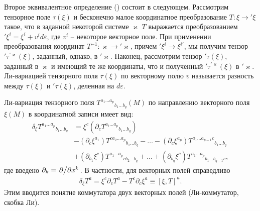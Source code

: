 \documentclass[12pt,a4paper]{article}
\begin{document}
        Второе эквивалентное определение (\cite{lie_derivative_theory}) состоит в следующем. Рассмотрим тензорное поле $\tau(\xi)$ и бесконечно малое координатное преобразование $T: \xi \rightarrow {'\xi}$ такое, что в заданной некоторой системе $\varkappa$ $T$ выражается преобразованием $'\xi^i = \xi^i + v^i d\varepsilon$, где $v^i$ -- некоторое векторное поле. При применении преобразования координат $T^{-1}: \varkappa \rightarrow {'\varkappa}$, причем $'\xi^i \rightarrow \xi^{i'}$, мы получим тензор $'\tau^{'\varkappa}(\xi)$, заданный, однако, в $'\varkappa$. Наконец, рассмотрим тензор $'\tau(\xi)$, заданный в $\varkappa$ и имеющий те же координаты, что и полученный $'\tau^{'\varkappa}(\xi)$ в $'\varkappa$. Ли-вариацией тензорного поля $\tau(\xi)$ по векторному полю $v$ называется разность между $\tau(\xi)$ и $'\tau(\xi)$, деленная на $d\varepsilon$.

        Ли-вариация тензорного поля ${T^{a_1 \dots a_p}}_{b_1 \dots b_q}(M)$ по направлению векторного поля $\xi(M)$ в координатной записи имеет вид:
        \begin{equation}\begin{aligned}
            \delta_\xi {T^{a_1 \dots a_p}}_{b_1 \dots b_q}
                &= \xi^c \left( \partial_c {T^{a_i \dots a_p}}_{b_1 \dots b_q} \right) \\
                &- \left( \partial_{c} \xi^{a_1} \right) {T^{c a_2 \dots a_p}}_{b_1 \dots b_q} - \dots
                 - \left( \partial_{c} \xi^{a_p} \right) {T^{a_1 \dots a_{p-1} c}}_{b_1 \dots b_q} \\
                &+ \left( \partial_{b_1} \xi^c \right) {T^{a_1 \dots a_p}}_{c b_2 \dots b_q} + \dots
                 + \left( \partial_{b_q} \xi^c \right) {T^{a_1 \dots a_p}}_{b_1 \dots b_{q-1} c} ,
        \end{aligned}\end{equation}
        где введено $\partial_k = \pdv*{x^k}$. В частности, для векторных полей справедливо
        \begin{equation}\begin{aligned}\label{eq:vector_field_commutator}
            \delta_\xi T^a
                = \xi^c \partial_c T^a - T^c \partial_{c} \xi^a
                \equiv [\xi, T]^a.
        \end{aligned}\end{equation}
        Этим вводится понятие коммутатора двух векторных полей (Ли-коммутатор, скобка Ли).
\end{document}
